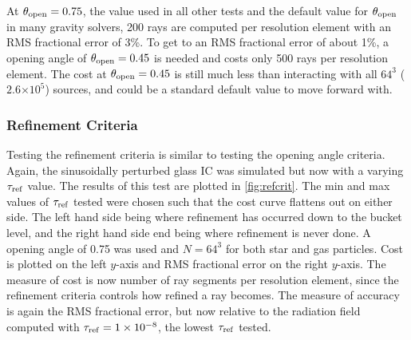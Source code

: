 \documentclass[fleq,usenatbib]{mnras}
\providecommand{\e}[1]{\ensuremath{\times10^{#1}}}
\newcommand{\tr}{\tau_{\rm ref}}
\newcommand{\tO}{\theta_{\rm open}}
\begin{document}
At $\tO=0.75$, the value used in all other tests and the 
default value for $\tO$ in many gravity solvers, 200 rays are 
computed per resolution element with an RMS fractional error of 3\%. To get to 
an RMS fractional error of about 1\%, a opening angle of $\tO=0.45$ is needed 
and costs only 500 rays per resolution element. The cost at 
$\tO=0.45$ is still much less than interacting with all $64^3$ 
($2.6\e{5}$) sources, and could be a standard default value to move forward 
with.

\subsubsection{Refinement Criteria}
Testing the refinement criteria is similar to testing the opening angle 
criteria. Again, the sinusoidally perturbed glass IC was simulated but now with 
a varying $\tr$ value. The results of this test are plotted in 
\ref{fig:refcrit}. The min and max values of $\tr$ tested were 
chosen such that the cost curve flattens out on either side. The left  hand 
side being where refinement has occurred down to the bucket level, and the 
right hand side end being where refinement is never done. 
A opening angle of 0.75 was used and $N=64^3$ for both star and gas particles. 
Cost is plotted on the left $y$-axis and RMS fractional error on the right 
$y$-axis. The measure of cost is now number of ray segments per resolution 
element, since the refinement criteria controls how refined a ray becomes. 
The measure of accuracy is again the RMS fractional error, but now relative to 
the radiation field computed with $\tr=1\e{-8}$, the lowest $\tr$ tested.
\end{document}
